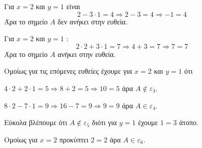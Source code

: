 \begin{alist}
\item Για $ x=2 $ και $ y=1 $ είναι 
\[ 2-3\cdot 1=4\Rightarrow 2-3=4\Rightarrow -1=4 \]
Άρα το σημείο $ A $ δεν ανήκει στην ευθεία.
\item Για $ x=2 $ και $ y=1 $ :
\[ 2\cdot 2+3\cdot 1=7\Rightarrow 4+3=7\Rightarrow 7=7 \]
Άρα το σημείο $ A $ ανήκει στην ευθεία.
\end{alist}
Ομοίως για τις επόμενες ευθείες έχουμε για $ x=2 $ και $ y=1 $ ότι
\begin{alist}[resume]
\item $ 4\cdot 2+2\cdot 1=5\Rightarrow 8+2=5\Rightarrow 10=5 $ άρα $ A\notin\varepsilon_3 $.
\item $ 8\cdot 2-7\cdot 1=9\Rightarrow 16-7=9\Rightarrow 9=9 $ άρα $ A\in\varepsilon_4 $.
\item Εύκολα βλέπουμε ότι $ A\notin\varepsilon_5 $ διότι για $ y=1 $ έχουμε $ 1=3 $ άτοπο.
\item Ομοίως για $ x=2 $ προκύπτει $ 2=2 $ άρα $ A\in\varepsilon_6 $.
\end{alist}

